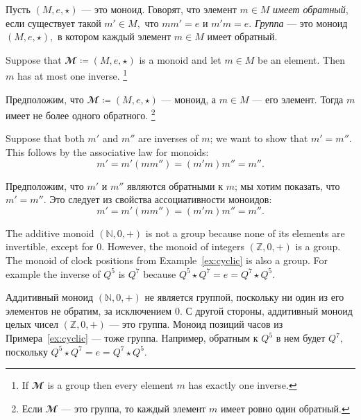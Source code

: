 \documentclass[../main/CT4S-EN-RU]{subfiles}
\begin{document}
\begin{definitionRUS}\label{def:group}
Пусть $(M,e,{⋆})$ — это моноид. Говорят, что элемент $m\in M$ {\em имеет обратный}, если существует такой $m'\in M,$ что $mm'=e$ и $m'm=e.$ {\em Группа} — это моноид $(M,e,{⋆}),$ в котором каждый элемент $m\in M$ имеет обратный.
\end{definitionRUS}

\begin{propositionENG}
Suppose that ${𝓜}{\coloneqq}(M,e,{⋆})$ is a monoid and let $m\in M$ be an element. Then $m$ has at most one inverse.%
\footnote{If ${𝓜}$ is a group then every element $m$ has exactly one inverse.}
\end{propositionENG}

\begin{propositionRUS}
Предположим, что ${𝓜}{\coloneqq}(M,e,{⋆})$ — моноид, а $m\in M$ — его элемент. Тогда $m$ имеет не более одного обратного.%
\footnote{Если ${𝓜}$ — это группа, то каждый элемент $m$ имеет ровно один обратный.}
\end{propositionRUS}

\begin{proofENG}
Suppose that both $m'$ and $m''$ are inverses of $m$; we want to show that $m'=m''.$ This follows by the associative law for monoids:
$$m'=m'(mm'')=(m'm)m''=m''.$$
\end{proofENG}

\begin{proofRUS}
Предположим, что $m'$ и $m''$ являются обратными к $m$; мы хотим показать, что $m'=m''.$ Это следует из свойства ассоциативности моноидов:
$$m'=m'(mm'')=(m'm)m''=m''.$$
\end{proofRUS}

\begin{exampleENG}
The additive monoid $({ℕ},0,+)$ is not a group because none of its elements are invertible, except for $0.$ However, the monoid of integers $({ℤ},0,+)$ is a group. The monoid of clock positions from Example~\ref{ex:cyclic} is also a group. For example the inverse of $Q^5$ is $Q^7$ because $Q^5{⋆} Q^7=e=Q^7{⋆} Q^5.$
\end{exampleENG}

\begin{exampleRUS}
Аддитивный моноид $({ℕ},0,+)$ не является группой, поскольку ни один из его элементов не обратим, за исключением $0.$ С другой стороны, аддитивный моноид целых чисел $({ℤ},0,+)$ — это группа. Моноид позиций часов из Примера~\ref{ex:cyclic} — тоже группа. Например, обратным к $Q^5$ в нем будет $Q^7,$ поскольку $Q^5{⋆} Q^7=e=Q^7{⋆} Q^5.$
\end{exampleRUS}
\end{document}
